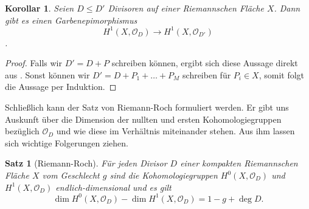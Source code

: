 \documentclass[11pt,a4paper,toc=bibliography]{scrartcl}
\theoremstyle{thm}
\newtheorem{satz}{Satz}[section]
\newtheorem{koro}{Korollar}[section]
\theoremstyle{def}
\theoremstyle{remark}
\begin{document}
\begin{koro}
Seien $D\leq D'$ Divisoren auf einer Riemannschen Fläche $X$. Dann gibt es einen Garbenepimorphismus
\[ H^1(X,\mathcal{O}_D)\rightarrow H^1(X,\mathcal{O}_{D'})\].
\end{koro}
\begin{proof}
    Falls wir $D'=D+P$ schreiben können, ergibt sich diese Aussage direkt aus . Sonst können wir $D'=D+P_1+\ldots+P_M$ schreiben für $P_i\in X$, somit folgt die Aussage per Induktion.
\end{proof}

Schließlich kann der Satz von Riemann-Roch formuliert werden. Er gibt uns Auskunft über die Dimension der nullten und ersten Kohomologiegruppen bezüglich $\mathcal{O}_D$ und wie diese im Verhältnis miteinander stehen. Aus ihm lassen sich wichtige Folgerungen ziehen.
\begin{satz}[Riemann-Roch]
Für jeden Divisor $D$ einer kompakten Riemannschen Fläche $X$ vom Geschlecht $g$ sind die Kohomologiegruppen $H^0(X,\mathcal{O}_D)$ und $H^1(X,\mathcal{O}_D)$ endlich-dimensional und es gilt
\[
\dim H^0(X,\mathcal{O}_D)-\dim H^1(X,\mathcal{O}_D)=1-g+\deg D.
\]
\end{satz}
\end{document}
